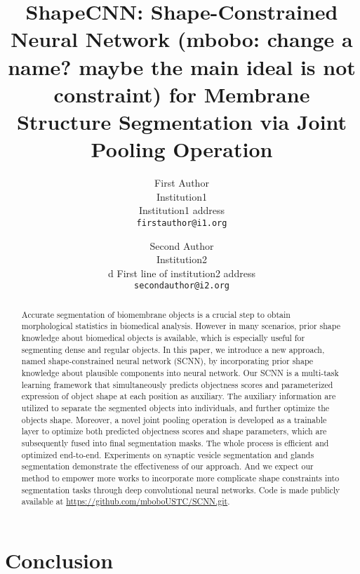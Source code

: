 \documentclass[10pt,twocolumn,letterpaper]{article}
\newcommand{\bobo}[1]{\textcolor[rgb]{0.00,0.30,0.00}{(mbobo: #1)}}
\begin{document}
\title{ShapeCNN: Shape-Constrained Neural Network \bobo{change a name? maybe the main ideal is not constraint} for Membrane Structure Segmentation via Joint Pooling Operation}

\author{First Author\\
Institution1\\
Institution1 address\\
{\tt\small firstauthor@i1.org}
\and
Second Author\\
Institution2\\d
First line of institution2 address\\
{\tt\small secondauthor@i2.org}
}



\maketitle


\begin{abstract}
   Accurate segmentation of biomembrane objects is a crucial step to obtain morphological statistics in biomedical analysis.
   However in many scenarios, prior shape knowledge about biomedical objects is available, which is especially useful for segmenting dense and regular objects.
   In this paper, we introduce a new approach, named shape-constrained neural network (SCNN), by incorporating prior shape knowledge about plausible components into neural network.
   Our SCNN is a multi-task learning framework that simultaneously predicts objectness scores and parameterized expression of object shape at each position as auxiliary.
   The auxiliary information are utilized to separate the segmented objects into individuals, and further optimize the objects shape.
   Moreover, a novel joint pooling operation is developed as a trainable layer to optimize both predicted objectness scores and shape parameters, which are subsequently fused into final segmentation masks.
   The whole process is efficient and optimized end-to-end.
   Experiments on synaptic vesicle segmentation and glands segmentation demonstrate the effectiveness of our approach.
   And we expect our method to empower more works to incorporate more complicate shape constraints into segmentation tasks through deep convolutional neural networks.
   Code is made publicly available at \url{https://github.com/mboboUSTC/SCNN.git}.

\end{abstract}





\section{Conclusion}








{\small


}
\end{document}
